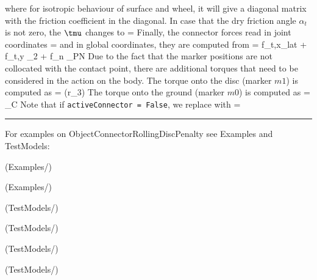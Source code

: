     \ee
    where for isotropic behaviour of surface and wheel, it will give a diagonal matrix with the friction coefficient in the diagonal.
    In case that the dry friction angle $\alpha_t$ is not zero, the $\tmu$ changes to
    \be
       =  
    \ee
    Finally, the connector forces read in joint coordinates
    \be \label{eq:ConnectorRollingDiscPenalty:forces}
       = 
    \ee
    and in global coordinates, they are computed from
    \be
       = f_{t,x}_{lat} + f_{t,y} _2 + f_n _{PN}
    \ee
    Due to the fact that the marker positions are not collocated with the contact point, 
    there are additional torques that need to be considered in the action on the body.
    The torque onto the disc (marker $m1$) is computed as
    \be
       = (r\cdot {}_3) \times {}
    \ee
    The torque onto the ground (marker $m0$) is computed as
    \be
       = _{C} \times {}
    \ee
    Note that if \texttt{activeConnector = False}, we replace  with
    \be
       = \Null
    \ee
\vspace{6pt}\par\noindent\rule{\textwidth}{0.4pt}
%
\noindent For examples on ObjectConnectorRollingDiscPenalty see Examples and TestModels:
\bi
\item {} (Examples/)
\item {} (Examples/)
\item {} (TestModels/)
\item {} (TestModels/)
\item {} (TestModels/)
\item {} (TestModels/)
\ei

